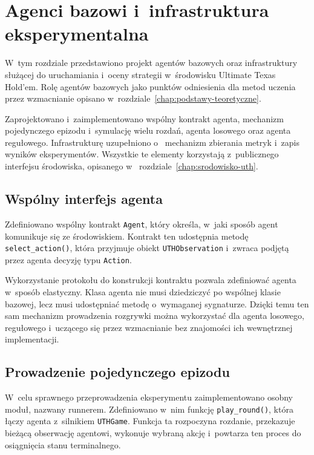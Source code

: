 \chapter{Agenci bazowi i~infrastruktura eksperymentalna}
\label{chap:agenci-bazowi}

W~tym rozdziale przedstawiono projekt agentów bazowych oraz
infrastruktury służącej do uruchamiania i~oceny strategii w~środowisku
Ultimate Texas Hold'em. Rolę agentów bazowych jako punktów odniesienia
dla metod uczenia przez wzmacnianie opisano w~rozdziale~\ref{chap:podstawy-teoretyczne}.

Zaprojektowano i~zaimplementowano wspólny kontrakt agenta, mechanizm
pojedynczego epizodu i~symulację wielu rozdań, agenta losowego oraz agenta regułowego.
Infrastrukturę uzupełniono o~
mechanizm zbierania metryk i~zapis wyników eksperymentów. Wszystkie te
elementy korzystają z~publicznego interfejsu środowiska, opisanego w~
rozdziale~\ref{chap:srodowisko-uth}.

\section{Wspólny interfejs agenta}
\label{sec:interfejs-agenta}

Zdefiniowano wspólny kontrakt \texttt{Agent},
który określa, w~jaki sposób agent komunikuje się ze środowiskiem.
Kontrakt ten udostępnia metodę \texttt{select\_action()},
która przyjmuje obiekt \texttt{UTHObservation} i~zwraca podjętą przez agenta decyzję typu \texttt{Action}.

Wykorzystanie protokołu do konstrukcji kontraktu pozwala zdefiniować
agenta w~sposób elastyczny. Klasa agenta nie musi dziedziczyć po wspólnej
klasie bazowej, lecz musi udostępniać metodę o~wymaganej sygnaturze.
Dzięki temu ten sam mechanizm prowadzenia rozgrywki można wykorzystać dla
agenta losowego, regułowego i~uczącego się przez wzmacnianie bez znajomości ich wewnętrznej
implementacji.

\section{Prowadzenie pojedynczego epizodu}
\label{sec:runner-pojedynczego-epizodu}

W~celu sprawnego przeprowadzenia eksperymentu zaimplementowano osobny moduł, nazwany runnerem.
Zdefiniowano w~nim funkcję \texttt{play\_round()}, która łączy agenta z~silnikiem
\texttt{UTHGame}. Funkcja ta rozpoczyna rozdanie, przekazuje bieżącą obserwację
agentowi, wykonuje wybraną akcję i~powtarza ten proces do osiągnięcia
stanu terminalnego.

